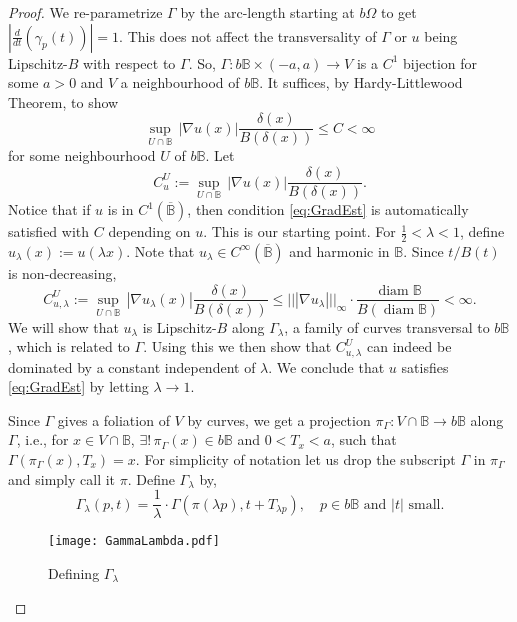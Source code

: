 \documentclass[12pt,a4paper]{amsart}
\numberwithin{equation}{section}
\theoremstyle{definition}
\begin{document}
\begin{proof}
We re-parametrize $\Gamma$ by the arc-length starting at $b\Omega$ to get ${\left\lvert{\frac{d}{dt}\left(\gamma_p(t)\right)}\right\rvert}=1$. This does not affect the transversality of 
$\Gamma$ or $u$ being Lipschitz-$B$ with respect to $\Gamma$. So, $\Gamma : b\mathbb{B}\times (-a,a) \to V$ is a $C^1$ bijection for some $a>0$ and $V$ a neighbourhood of $b\mathbb{B}$. It suffices, by 
Hardy-Littlewood Theorem, to show
\begin{equation}\label{eq:GradEst}\sup\limits_{U\cap\mathbb{B}}\, {\left\lvert{\nabla u(x)}\right\rvert}\frac{\delta(x)}{B(\delta(x))} \le C < \infty\end{equation}
for some neighbourhood $U$ of $b\mathbb{B}$. Let
\[C_u^U := \sup\limits_{U\cap\mathbb{B}}\, {\left\lvert{\nabla u(x)}\right\rvert}\frac{\delta(x)}{B(\delta(x))}.\]
Notice that if $u$ is in $C^1\left(\overline{\mathbb{B}}\right)$, then condition \eqref{eq:GradEst} is automatically satisfied with $C$ depending on $u$. This is our starting point. For $\frac{1}{2} < \lambda < 1$, 
define $u_{\lambda}(x) := u(\lambda x)$. Note that $u_{\lambda}\in C^{\infty}\left(\overline{\mathbb{B}}\right)$ and harmonic in $\mathbb{B}$. Since $t/B(t)$ is non-decreasing,
\[C_{u,\lambda}^U := \sup\limits_{U\cap\mathbb{B}}\, {\left\lvert{\nabla u_\lambda (x)}\right\rvert}\frac{\delta(x)}{B(\delta(x))} \le ||{\left\lvert{\nabla u_\lambda}\right\rvert}||_{\infty}\cdot\frac{\operatorname{diam} \mathbb{B}}{B\left(\operatorname{diam} \mathbb{B}\right)} < \infty.\] 
We will show that $u_\lambda$ is Lipschitz-$B$ along $\Gamma_\lambda$, a family of curves transversal to $b\mathbb{B}$, which is related to $\Gamma$. Using this we then show that $C_{u,\lambda}^U$ can 
indeed be dominated by a constant independent of $\lambda$. We conclude that $u$ satisfies \eqref{eq:GradEst} by letting $\lambda \to 1$.

Since $\Gamma$ gives a foliation of $V$ by curves, we get a projection $\pi_\Gamma : V\cap \mathbb{B} \to b\mathbb{B}$ along $\Gamma$, i.e., for $x\in V\cap\mathbb{B}$, $\exists!\, \pi_\Gamma(x)\in 
b\mathbb{B}$ and $0 < T_x < a$, such that $\Gamma(\pi_\Gamma(x), T_x) = x$. For 
simplicity of notation let us drop the subscript $\Gamma$ in $\pi_\Gamma$ and simply call it $\pi$. Define $\Gamma_\lambda$ by, 
\[\Gamma_\lambda(p,t) = \frac{1}{\lambda}\cdot\Gamma\left(\pi(\lambda p), t+T_{\lambda p}\right), \quad p\in b\mathbb{B} \text{ and } {\left\lvert{t}\right\rvert} \text { small}.\]
\begin{figure}[h]
\begin{center}
\texttt{[image: GammaLambda.pdf]}
\caption{Defining $\Gamma_\lambda$}
\label{GammaLambdaDefn}
\end{center}
\end{figure}


\end{proof}
\end{document}
